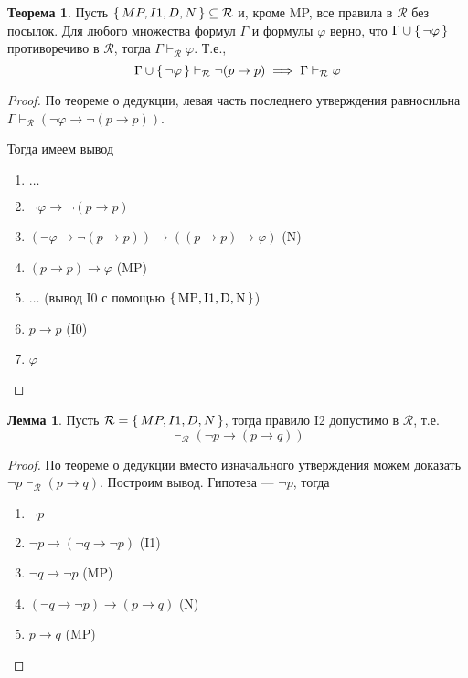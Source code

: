 \documentclass[12pt]{article}
\let\im\rightarrow
\let\n\neg
\let\un\cup
\let\sus\subseteq
\theoremstyle{definition}
\newtheorem{theorem}{Теорема}[section]
\theoremstyle{statement}
\theoremstyle{theorem}
\newtheorem{lemma}{Лемма}[section]
\begin{document}
\begin{theorem}
  Пусть $\set{MP, I1, D, N} \sus \mathcal{R}$ и, кроме MP, все
  правила в $\mathcal{R}$ без посылок. Для любого множества формул
  $\Gamma$ и формулы $\varphi$ верно, что $\Gamma \un \set{\n
  \varphi}$ противоречиво в $\mathcal{R}$, тогда $\Gamma
  \vdash_{\mathcal{R}} \varphi$. Т.е.,
  \begin{displaymath}
    \Gamma \un \set{\n \varphi} \vdash_{\mathcal{R}} \n (p \im p)
    \implies \Gamma \vdash_{\mathcal{R}} \varphi
  \end{displaymath}
  \begin{proof}
    По теореме о дедукции, левая часть последнего утверждения
    равносильна $\Gamma \vdash_{\mathcal{R}} (\n \varphi \im \n (p \im p))$.

    Тогда имеем вывод
    \begin{enumerate}
      \item $\dots$

      \item $\n \varphi \im \n (p \im p)$

      \item $(\n \varphi \im \n (p \im p)) \im ((p \im p) \im \varphi)$ (N)

      \item $(p \im p) \im \varphi$ (MP)

      \item $\dots$ (вывод I0 с помощью $\set{\mathrm{MP},
        \mathrm{I1}, \mathrm{D}, \mathrm{N}}$)

      \item $p \im p$ (I0)

      \item $\varphi$
    \end{enumerate}
  \end{proof}
\end{theorem}

\begin{lemma}
  Пусть $\mathcal{R} = \set{MP, I1, D, N}$, тогда правило I2
  допустимо в $\mathcal{R}$, т.е.
  \begin{displaymath}
    \vdash_{\mathcal{R}} (\n p \im (p \im q))
  \end{displaymath}
  \begin{proof}
    По теореме о дедукции вместо изначального утверждения можем
    доказать $\n p \vdash_{\mathcal{R}} (p \im q)$. Построим вывод.
    Гипотеза --- $\n p$, тогда
    \begin{enumerate}
      \item $\n p$

      \item $\n p \im (\n q \im \n p)$ (I1)

      \item $\n q \im \n p$ (MP)

      \item $(\n q \im \n p) \im (p \im q)$ (N)

      \item $p \im q$ (MP)
    \end{enumerate}
  \end{proof}
\end{lemma}
\end{document}
